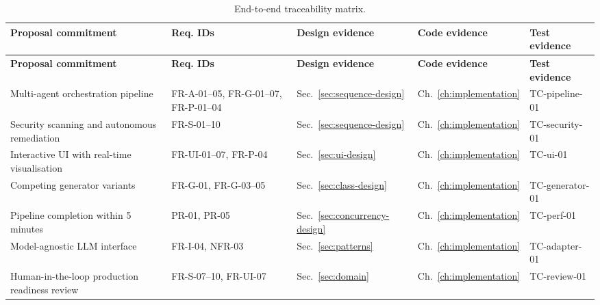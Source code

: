 \begin{longtable}{@{}p{}p{}p{}p{}p{}@{}}
\caption{End-to-end traceability matrix.}\label{tab:traceability}\\
\toprule
\textbf{Proposal commitment} & \textbf{Req. IDs} & \textbf{Design evidence} & \textbf{Code evidence} & \textbf{Test evidence} \\
\midrule
\endfirsthead
\toprule
\textbf{Proposal commitment} & \textbf{Req. IDs} & \textbf{Design evidence} & \textbf{Code evidence} & \textbf{Test evidence} \\
\midrule
\endhead

Multi-agent orchestration pipeline &
  FR-A-01--05, FR-G-01--07, FR-P-01--04 &
  Sec.~\ref{sec:sequence-design} &
  Ch.~\ref{ch:implementation} &
  TC-pipeline-01 \\

Security scanning and autonomous remediation &
  FR-S-01--10 &
  Sec.~\ref{sec:sequence-design} &
  Ch.~\ref{ch:implementation} &
  TC-security-01 \\

Interactive UI with real-time visualisation &
  FR-UI-01--07, FR-P-04 &
  Sec.~\ref{sec:ui-design} &
  Ch.~\ref{ch:implementation} &
  TC-ui-01 \\

Competing generator variants &
  FR-G-01, FR-G-03--05 &
  Sec.~\ref{sec:class-design} &
  Ch.~\ref{ch:implementation} &
  TC-generator-01 \\

Pipeline completion within 5 minutes &
  PR-01, PR-05 &
  Sec.~\ref{sec:concurrency-design} &
  Ch.~\ref{ch:implementation} &
  TC-perf-01 \\

Model-agnostic LLM interface &
  FR-I-04, NFR-03 &
  Sec.~\ref{sec:patterns} &
  Ch.~\ref{ch:implementation} &
  TC-adapter-01 \\

Human-in-the-loop production readiness review &
  FR-S-07--10, FR-UI-07 &
  Sec.~\ref{sec:domain} &
  Ch.~\ref{ch:implementation} &
  TC-review-01 \\

\bottomrule
\end{longtable}